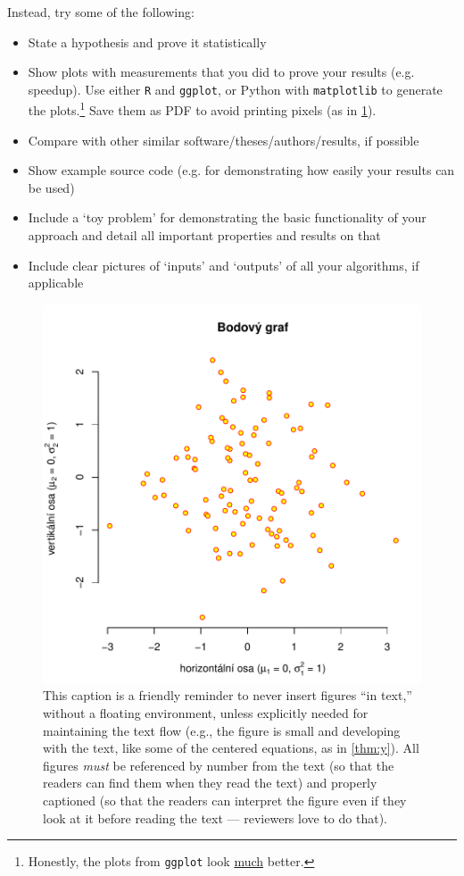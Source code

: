 Instead, try some of the following:
\begin{itemize}
\item State a hypothesis and prove it statistically
\item Show plots with measurements that you did to prove your results (e.g. speedup). Use either \texttt{R} and \texttt{ggplot}, or Python with \texttt{matplotlib} to generate the plots.\footnote{Honestly, the plots from \texttt{ggplot} look \underline{much} better.} Save them as PDF to avoid printing pixels (as in \cref{fig:f}).
\item Compare with other similar software/theses/authors/results, if possible
\item Show example source code (e.g. for demonstrating how easily your results can be used)
\item Include a `toy problem' for demonstrating the basic functionality of your approach and detail all important properties and results on that
\item Include clear pictures of `inputs' and `outputs' of all your algorithms, if applicable
\end{itemize}

\begin{figure}
\centering
\includegraphics[width=.6\linewidth]{img/ukazka-obr01.pdf}
\caption{This caption is a friendly reminder to never insert figures ``in text,'' without a floating environment, unless explicitly needed for maintaining the text flow (e.g., the figure is small and developing with the text, like some of the centered equations, as in \cref{thm:y}). All figures \emph{must} be referenced by number from the text (so that the readers can find them when they read the text) and properly captioned (so that the readers can interpret the figure even if they look at it before reading the text --- reviewers love to do that).}
\label{fig:f}
\end{figure}

